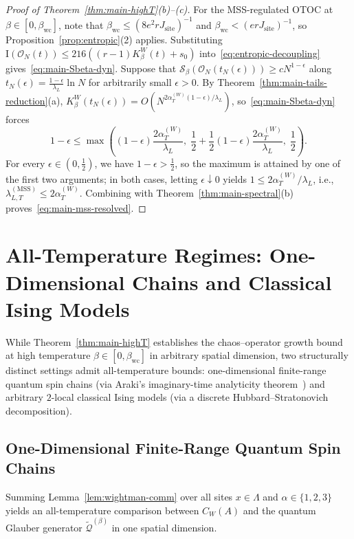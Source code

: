 \documentclass[11pt,a4paper]{article}
\numberwithin{equation}{section}
\theoremstyle{plain}
\theoremstyle{definition}
\newcommand{\MSS}{\mathrm{MSS}}
\begin{document}
\begin{proof}[Proof of Theorem~\ref{thm:main-highT}(b)--(c)]
For the MSS-regulated OTOC at $\beta\in[0,\beta_{\mathrm{wc}}]$, note that $\beta_{\mathrm{wc}} \le (8e^2 r J_{\mathrm{site}})^{-1}$ and $\beta_{\mathrm{wc}} < (erJ_{\mathrm{site}})^{-1}$, so Proposition~\ref{prop:entropic}(2) applies. Substituting $\mathrm{I}(\mathcal{O}_N(t)) \le 216((r-1)K_\beta^W(t)+s_0)$ into~\eqref{eq:entropic-decoupling} gives~\eqref{eq:main-Sbeta-dyn}. Suppose that $\mathcal{S}_\beta(\mathcal{O}_N(t_N(\epsilon))) \ge c N^{1-\epsilon}$ along $t_N(\epsilon) = \frac{1-\epsilon}{\lambda_L}\ln N$ for arbitrarily small $\epsilon > 0$. By Theorem~\ref{thm:main-tails-reduction}(a), $K_\beta^W(t_N(\epsilon)) = O(N^{2\alpha_T^{(W)}(1-\epsilon)/\lambda_L})$, so~\eqref{eq:main-Sbeta-dyn} forces
\[
  1 - \epsilon \le \max\!\left((1-\epsilon)\frac{2\alpha_T^{(W)}}{\lambda_L},\; \frac{1}{2} + \frac{1}{2}(1-\epsilon)\frac{2\alpha_T^{(W)}}{\lambda_L},\; \frac{1}{2}\right).
\]
For every $\epsilon\in(0,\frac{1}{2})$, we have $1-\epsilon > \frac{1}{2}$, so the maximum is attained by one of the first two arguments; in both cases, letting $\epsilon\downarrow 0$ yields $1 \le 2\alpha_T^{(W)}/\lambda_L$, i.e., $\lambda_{L,T}^{(\MSS)} \le 2\alpha_T^{(W)}$. Combining with Theorem~\ref{thm:main-spectral}(b) proves~\eqref{eq:main-mss-resolved}.
\end{proof}

\section{All-Temperature Regimes: One-Dimensional Chains and Classical Ising Models}\label{sec:ising}

While Theorem~\ref{thm:main-highT} establishes the chaos--operator growth bound at high temperature $\beta\in[0,\beta_{\mathrm{wc}}]$ in arbitrary spatial dimension, two structurally distinct settings admit all-temperature bounds: one-dimensional finite-range quantum spin chains (via Araki's imaginary-time analyticity theorem~\cite{Araki1969}) and arbitrary $2$-local classical Ising models (via a discrete Hubbard--Stratonovich decomposition).

\subsection{One-Dimensional Finite-Range Quantum Spin Chains}\label{subsec:1d-allT}

Summing Lemma~\ref{lem:wightman-comm} over all sites $x\in\Lambda$ and $\alpha\in\{1,2,3\}$ yields an all-temperature comparison between $C_W(A)$ and the quantum Glauber generator $\widetilde{\mathcal{Q}}^{(\beta)}$ in one spatial dimension.
\end{document}
